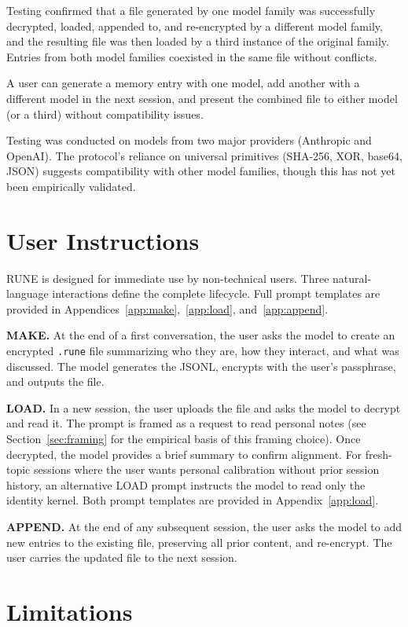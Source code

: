 \documentclass[11pt,a4paper]{article}
\begin{document}
Testing confirmed that a file generated by one model family was successfully decrypted, loaded, appended to, and re-encrypted by a different model family, and the resulting file was then loaded by a third instance of the original family. Entries from both model families coexisted in the same file without conflicts.

A user can generate a memory entry with one model, add another with a different model in the next session, and present the combined file to either model (or a third) without compatibility issues.

Testing was conducted on models from two major providers (Anthropic and OpenAI). The protocol's reliance on universal primitives (SHA-256, XOR, base64, JSON) suggests compatibility with other model families, though this has not yet been empirically validated.

\section{User Instructions}

RUNE is designed for immediate use by non-technical users. Three natural-language interactions define the complete lifecycle. Full prompt templates are provided in Appendices~\ref{app:make},~\ref{app:load}, and~\ref{app:append}.

\textbf{MAKE.} At the end of a first conversation, the user asks the model to create an encrypted \texttt{.rune} file summarizing who they are, how they interact, and what was discussed. The model generates the JSONL, encrypts with the user's passphrase, and outputs the file.

\textbf{LOAD.} In a new session, the user uploads the file and asks the model to decrypt and read it. The prompt is framed as a request to read personal notes (see Section~\ref{sec:framing} for the empirical basis of this framing choice). Once decrypted, the model provides a brief summary to confirm alignment. For fresh-topic sessions where the user wants personal calibration without prior session history, an alternative LOAD prompt instructs the model to read only the identity kernel. Both prompt templates are provided in Appendix~\ref{app:load}.

\textbf{APPEND.} At the end of any subsequent session, the user asks the model to add new entries to the existing file, preserving all prior content, and re-encrypt. The user carries the updated file to the next session.

\section{Limitations}
\end{document}
